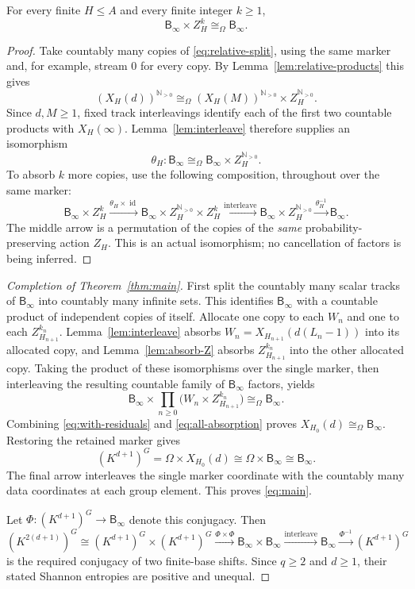 \documentclass[11pt,a4paper]{article}
\numberwithin{equation}{section}
\DeclareMathOperator{\id}{id}
\newcommand{\NN}{\mathbb N}
\newcommand{\reliso}{\mathrel{\cong_{\Omega}}}
\newcommand{\Binf}{\mathsf B_\infty}
\begin{document}
\begin{lemma}\label{lem:absorb-Z}
For every finite $H\leq A$ and every finite integer $k\geq1$,
\[
 \Binf\times Z_H^k\reliso\Binf.
\]
\end{lemma}
\begin{proof}
Take countably many copies of \eqref{eq:relative-split}, using the same
marker and, for example, stream $0$ for every copy. By
Lemma~\ref{lem:relative-products} this gives
\[
 (X_H(d))^{\NN_{>0}}\reliso
 (X_H(M))^{\NN_{>0}}\times Z_H^{\NN_{>0}}.
\]
Since $d,M\geq1$, fixed track interleavings identify each of the first
two countable products with $X_H(\infty)$. Lemma~\ref{lem:interleave}
therefore supplies an isomorphism
\begin{equation}\label{eq:absorb-countable}
 \theta_H:\Binf\reliso\Binf\times Z_H^{\NN_{>0}}.
\end{equation}
To absorb $k$ more copies, use the following composition, throughout
over the same marker:
\[
 \Binf\times Z_H^k
 \xrightarrow{\theta_H\times\id}
 \Binf\times Z_H^{\NN_{>0}}\times Z_H^k
 \xrightarrow{\text{interleave}}
 \Binf\times Z_H^{\NN_{>0}}
 \xrightarrow{\theta_H^{-1}}\Binf.
\]
The middle arrow is a permutation of the copies of the \emph{same}
probability-preserving action $Z_H$. This is an actual isomorphism;
no cancellation of factors is being inferred.
\end{proof}

\begin{proof}[Completion of Theorem~\ref{thm:main}]
First split the countably many scalar tracks of $\Binf$ into countably
many infinite sets. This identifies $\Binf$ with a countable product
of independent copies of itself. Allocate one copy to each $W_n$ and
one to each $Z_{H_{n+1}}^{k_n}$. Lemma~\ref{lem:interleave} absorbs
$W_n=X_{H_{n+1}}(d(L_n-1))$ into its allocated copy, and
Lemma~\ref{lem:absorb-Z} absorbs $Z_{H_{n+1}}^{k_n}$ into the other
allocated copy. Taking the product of these isomorphisms over the
single marker, then interleaving the resulting countable family of
$\Binf$ factors, yields
\begin{equation}\label{eq:all-absorption}
 \Binf\times\prod_{n\geq0}
       \bigl(W_n\times Z_{H_{n+1}}^{k_n}\bigr)
       \reliso\Binf.
\end{equation}
Combining \eqref{eq:with-residuals} and \eqref{eq:all-absorption} proves
$X_{H_0}(d)\reliso\Binf$. Restoring the retained marker gives
\[
 (K^{d+1})^G
     =\Omega\times X_{H_0}(d)
     \cong\Omega\times\Binf
     \cong\Binf.
\]
The final arrow interleaves the single marker coordinate with the
countably many data coordinates at each group element. This proves
\eqref{eq:main}.

Let $\Phi:(K^{d+1})^G\to\Binf$ denote this conjugacy. Then
\[
 (K^{2(d+1)})^G
 \cong (K^{d+1})^G\times(K^{d+1})^G
 \xrightarrow{\Phi\times\Phi}\Binf\times\Binf
 \xrightarrow{\text{interleave}}\Binf
 \xrightarrow{\Phi^{-1}}(K^{d+1})^G
\]
is the required conjugacy of two finite-base shifts. Since $q\geq2$
and $d\geq1$, their stated Shannon entropies are positive and unequal.
\end{proof}
\end{document}
